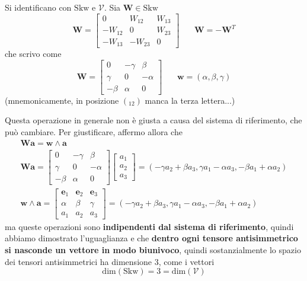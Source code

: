 \documentclass[10pt,a4paper,twoside]{book}
\begin{document}
Si identificano con $\mathrm{Skw}$ e $\mathcal{V}$. Sia $\mathbf{W} \in \mathrm{Skw}$
\begin{equation*}
\mathbf{W} =\begin{bmatrix}
0 & W_{12} & W_{13}\\
-W_{12} & 0 & W_{23}\\
-W_{13} & -W_{23} & 0
\end{bmatrix} \ \ \ \ \ \ \ \ \mathbf{W} =-\mathbf{W}^{T}
\end{equation*}
che scrivo come
\begin{equation*}
\mathbf{W} =\begin{bmatrix}
0 & -\gamma  & \beta \\
\gamma  & 0 & -\alpha \\
-\beta  & \alpha  & 0
\end{bmatrix} \ \ \ \ \ \ \ \ \mathbf{w} =( \alpha ,\beta ,\gamma )
\end{equation*}
(mnemonicamente, in posizione $(_{12})$ manca la terza lettera...)

Questa operazione in generale non è giusta a causa del sistema di riferimento, che può cambiare. Per giustificare, affermo allora che
\begin{gather*}
\boxed{\mathbf{Wa} =\mathbf{w} \land \mathbf{a}}\\
\mathbf{Wa} =\begin{bmatrix}
0 & -\gamma  & \beta \\
\gamma  & 0 & -\alpha \\
-\beta  & \alpha  & 0
\end{bmatrix}\begin{bmatrix}
a_{1}\\
a_{2}\\
a_{3}
\end{bmatrix} =( -\gamma a_{2} +\beta a_{3} ,\gamma a_{1} -\alpha a_{3} ,-\beta a_{1} +\alpha a_{2})\\
\mathbf{w} \land \mathbf{a} =\begin{bmatrix}
\mathbf{e}_{1} & \mathbf{e}_{2} & \mathbf{e}_{3}\\
\alpha  & \beta  & \gamma \\
a_{1} & a_{2} & a_{3}
\end{bmatrix} =( -\gamma a_{2} +\beta a_{3} ,\gamma a_{1} -\alpha a_{3} ,-\beta a_{1} +\alpha a_{2})
\end{gather*}
ma queste operazioni sono \textbf{indipendenti dal sistema di riferimento}, quindi abbiamo dimostrato l'uguaglianza e che \textbf{dentro ogni tensore antisimmetrico si nasconde un vettore in modo biunivoco}, quindi sostanzialmente lo spazio dei tensori antisimmetrici ha dimensione $3$, come i vettori
\begin{equation*}
\mathrm{dim}(\mathrm{Skw}) =3=\mathrm{dim}(\mathcal{V})
\end{equation*}
\end{document}
